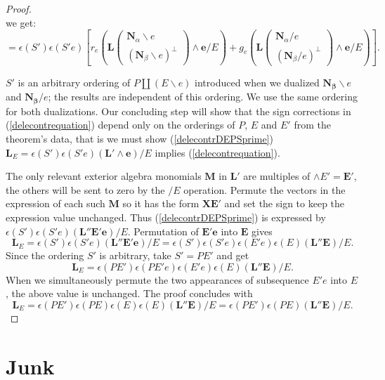 \documentclass[Unicode]{cedram-alco}
\newcommand{\ext}[1]{\ensuremath{\mathbf{#1}}}
\newcommand{\eNal}{\ensuremath{\ext{N}_{\alpha}}}
\newcommand{\eNbe}{\ensuremath{\ext{N}_\beta}}
\newcommand{\dunion}{\coprod}
\begin{document}
\begin{proof}
\[       \]
we get:         
\begin{equation}\label{delecontrDEPSprime}
= \epsilon(S')\epsilon(S'e)
\left[
        r_e\left(\ext{L}\left(
        \begin{array}{c} \eNal\backslash e \\
    (\eNbe\backslash e)^\perp
    \end{array}
    \right)  \wedge \ext{e} /E \right)
+
        g_e\left(\ext{L}\left(
        \begin{array}{c} \eNal / e \\
    (\eNbe / e)^\perp \end{array} \right) \wedge \ext{e} /E \right)
\right].
\end{equation}

$S'$ is an arbitrary ordering of $P\dunion (E\backslash e)$ introduced
when we dualized $\ext{N_\beta}\backslash e$ and
$\ext{N_\beta}/ e$; the results are independent of this ordering.
We use the same ordering for both dualizations.
Our concluding
step will show that the sign corrections in (\ref{delecontrequation}) depend only
on the orderings of $P$, $E$ and $E'$ from the theorem's data, that is
we must show (\ref{delecontrDEPSprime})
$\ext{L}_E=\epsilon(S')\epsilon(S'e)(\ext{L'}\wedge \ext{e})/E$
implies (\ref{delecontrequation}).

The only relevant exterior algebra monomials $\ext{M}$ in $\ext{L'}$ are multiples of $\wedge E'=\ext{E'}$,
the others will be sent to zero by the $/E$ operation.
Permute the vectors in the expression of each such $\ext{M}$ so it
has the form $\ext{X}\ext{E'}$ and set the sign to keep
the expression value unchanged.
Thus (\ref{delecontrDEPSprime}) is expressed by
$\epsilon(S')\epsilon(S'e)(\ext{L''}\ext{E'}\ext{e})/E$. Permutation of $\ext{E'e}$
into $\ext{E}$ gives
\[
\ext{L}_E=\epsilon(S')\epsilon(S'e)(\ext{L''}\ext{E'}\ext{e})/E
=\epsilon(S')\epsilon(S'e)\epsilon(E'e)\epsilon(E)(\ext{L''}\ext{E})/E.
\]
Since the ordering $S'$ is arbitrary, take $S'=PE'$ and get
\[
\ext{L}_E = \epsilon(PE')\epsilon(PE'e)\epsilon(E'e)\epsilon(E)(\ext{L''}\ext{E})/E.
\]
When we simultaneously permute the two appearances of subsequence $E'e$ into $E$,
the above value is unchanged.  The proof concludes with
\[
\ext{L}_E = \epsilon(PE')\epsilon(PE)\epsilon(E)\epsilon(E)(\ext{L''}\ext{E})/E
=\epsilon(PE')\epsilon(PE)(\ext{L''}\ext{E})/E.
\]
\end{proof}



\section{Junk}
\end{document}
